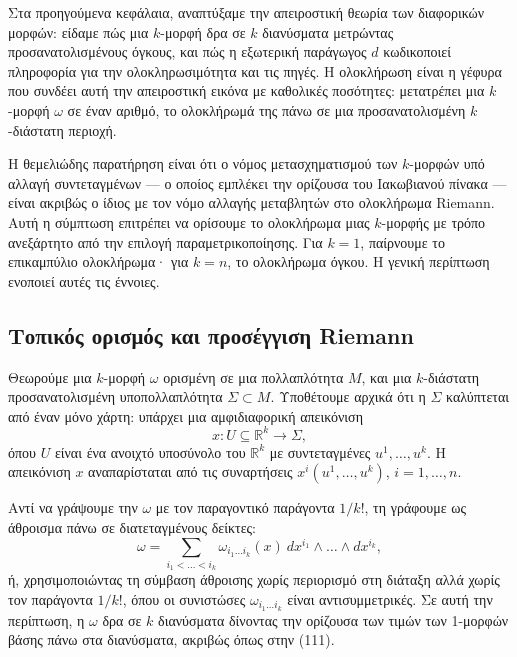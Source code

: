 \documentclass[12pt]{article}
\begin{document}
Στα προηγούμενα κεφάλαια, αναπτύξαμε την απειροστική θεωρία των διαφορικών μορφών: είδαμε πώς μια $k$-μορφή δρα σε $k$ διανύσματα μετρώντας προσανατολισμένους όγκους, και πώς η εξωτερική παράγωγος $d$ κωδικοποιεί πληροφορία για την ολοκληρωσιμότητα και τις πηγές. Η ολοκλήρωση είναι η γέφυρα που συνδέει αυτή την απειροστική εικόνα με καθολικές ποσότητες: μετατρέπει μια $k$-μορφή $\omega$ σε έναν αριθμό, το ολοκλήρωμά της πάνω σε μια προσανατολισμένη $k$-διάστατη περιοχή.

Η θεμελιώδης παρατήρηση είναι ότι ο νόμος μετασχηματισμού των $k$-μορφών υπό αλλαγή συντεταγμένων — ο οποίος εμπλέκει την ορίζουσα του Ιακωβιανού πίνακα — είναι ακριβώς ο ίδιος με τον νόμο αλλαγής μεταβλητών στο ολοκλήρωμα Riemann. Αυτή η σύμπτωση επιτρέπει να ορίσουμε το ολοκλήρωμα μιας $k$-μορφής με τρόπο ανεξάρτητο από την επιλογή παραμετρικοποίησης. Για $k=1$, παίρνουμε το επικαμπύλιο ολοκλήρωμα· για $k=n$, το ολοκλήρωμα όγκου. Η γενική περίπτωση ενοποιεί αυτές τις έννοιες.

\subsection{Τοπικός ορισμός και προσέγγιση Riemann}

Θεωρούμε μια $k$-μορφή $\omega$ ορισμένη σε μια πολλαπλότητα $M$, και μια $k$-διάστατη προσανατολισμένη υποπολλαπλότητα $\Sigma \subset M$. Υποθέτουμε αρχικά ότι η $\Sigma$ καλύπτεται από έναν μόνο χάρτη: υπάρχει μια αμφιδιαφορική απεικόνιση
\[
x: U \subseteq \mathbb{R}^k \to \Sigma,
\]
όπου $U$ είναι ένα ανοιχτό υποσύνολο του $\mathbb{R}^k$ με συντεταγμένες $u^1, \dots, u^k$. Η απεικόνιση $x$ αναπαρίσταται από τις συναρτήσεις $x^i(u^1, \dots, u^k)$, $i = 1, \dots, n$.

Αντί να γράψουμε την $\omega$ με τον παραγοντικό παράγοντα $1/k!$, τη γράφουμε ως άθροισμα πάνω σε διατεταγμένους δείκτες:
\[
\omega = \sum_{i_1 < \dots < i_k} \omega_{i_1 \dots i_k}(x) \ dx^{i_1} \wedge \dots \wedge dx^{i_k},
\]
ή, χρησιμοποιώντας τη σύμβαση άθροισης χωρίς περιορισμό στη διάταξη αλλά χωρίς τον παράγοντα $1/k!$, όπου οι συνιστώσες $\omega_{i_1 \dots i_k}$ είναι αντισυμμετρικές. Σε αυτή την περίπτωση, η $\omega$ δρα σε $k$ διανύσματα δίνοντας την ορίζουσα των τιμών των 1-μορφών βάσης πάνω στα διανύσματα, ακριβώς όπως στην (111).
\end{document}

